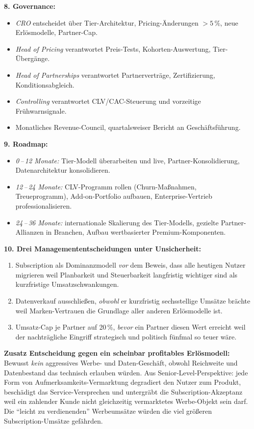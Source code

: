 \documentclass[11pt,a4paper,oneside]{article}
\begin{document}
\begin{loesungbox}
\smallskip
\textbf{8. Governance:}
\begin{itemize}
  \item \emph{CRO} entscheidet über Tier-Architektur, Pricing-Änderungen $> 5\,\%$, neue Erlösmodelle, Partner-Cap.
  \item \emph{Head of Pricing} verantwortet Preis-Tests, Kohorten-Auswertung, Tier-Übergänge.
  \item \emph{Head of Partnerships} verantwortet Partnerverträge, Zertifizierung, Konditionsabgleich.
  \item \emph{Controlling} verantwortet CLV/CAC-Steuerung und vorzeitige Frühwarnsignale.
  \item Monatliches Revenue-Council, quartalsweiser Bericht an Geschäftsführung.
\end{itemize}

\smallskip
\textbf{9. Roadmap:}
\begin{itemize}
  \item \emph{0\,--\,12 Monate:} Tier-Modell überarbeiten und live, Partner-Konsolidierung, Datenarchitektur konsolidieren.
  \item \emph{12\,--\,24 Monate:} CLV-Programm rollen (Churn-Maßnahmen, Treueprogramm), Add-on-Portfolio aufbauen, Enterprise-Vertrieb professionalisieren.
  \item \emph{24\,--\,36 Monate:} internationale Skalierung des Tier-Modells, gezielte Partner-Allianzen in Branchen, Aufbau wertbasierter Premium-Komponenten.
\end{itemize}

\smallskip
\textbf{10. Drei Managemententscheidungen unter Unsicherheit:}
\begin{enumerate}
  \item Subscription als Dominanzmodell \emph{vor} dem Beweis, dass alle heutigen Nutzer migrieren \textendash{} weil Planbarkeit und Steuerbarkeit langfristig wichtiger sind als kurzfristige Umsatzschwankungen.
  \item Datenverkauf ausschließen, \emph{obwohl} er kurzfristig sechsstellige Umsätze brächte \textendash{} weil Marken-Vertrauen die Grundlage aller anderen Erlösmodelle ist.
  \item Umsatz-Cap je Partner auf 20\,\%, \emph{bevor} ein Partner diesen Wert erreicht \textendash{} weil der nachträgliche Eingriff strategisch und politisch fünfmal so teuer wäre.
\end{enumerate}

\smallskip
\textbf{Zusatz \textendash{} Entscheidung gegen ein scheinbar profitables Erlösmodell:}
Bewusst \emph{kein} aggressives Werbe- und Daten-Geschäft, obwohl Reichweite und Datenbestand das technisch erlauben würden. Aus Senior-Level-Perspektive: jede Form von Aufmerksamkeits-Vermarktung degradiert den Nutzer zum Produkt, beschädigt das Service-Versprechen und untergräbt die Subscription-Akzeptanz \textendash{} weil ein zahlender Kunde nicht gleichzeitig vermarktetes Werbe-Objekt sein darf. Die ``leicht zu verdienenden'' Werbeumsätze würden die viel größeren Subscription-Umsätze gefährden.
\end{loesungbox}
\end{document}
